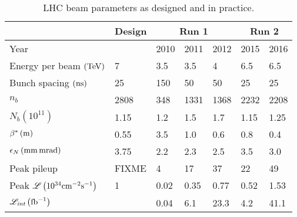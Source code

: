 \begin{table}
\caption{LHC beam parameters as designed and in practice.}
\centering
\begin{tabular}{lllllll}
\hline
                                                                     & \multicolumn{1}{c}{Design} & \multicolumn{3}{c}{Run 1}  & \multicolumn{2}{c}{Run 2} \\
\hline
Year                                                                 &          & 2010    & 2011    & 2012    & 2015    & 2016                               \\
\hline\hline
Energy per beam $\left(\mathrm{Te\hspace{-.08em}V}\right)$                                & 7        & 3.5     & 3.5     & 4       & 6.5     & 6.5                                \\
Bunch spacing $\left(\mathrm{ns}\right)$                             & 25       & 150     & 50      & 50      & 25      & 25                                 \\
$n_b$                                                                & 2808     & 348     & 1331    & 1368    & 2232    & 2208                               \\
$N_b \left(10^{11}\right)$                                           & 1.15     & 1.2     & 1.5     & 1.7     & 1.15    & 1.25                               \\
$\beta^\ast \left(\mathrm{m}\right)$                                 & 0.55     & 3.5     & 1.0     & 0.6     & 0.8     & 0.4                                \\
$\epsilon_N \left(\mathrm{mm}\mathrm{\,mrad}\right)$                     & 3.75     & 2.2     & 2.3     & 2.5     & 3.5     & 3.0                                \\
Peak pileup                                                          & FIXME    & 4       & 17      & 37      & 22      & 49                                 \\
Peak $\mathscr{L} \left(10^{34}\mathrm{cm}^{-2}\mathrm{s}^{-1}\right)$    & 1        & 0.02    & 0.35    & 0.77    & 0.52    & 1.53                               \\
$\mathscr{L}_\textit{int} \left(\mbox{\ensuremath{\mathrm{fb}^{-1}}}\right)$                          &          & 0.04    & 6.1     & 23.3    & 4.2     & 41.1                               \\
\hline

\end{tabular}
\label{tab:lhcparams}
\end{table}

